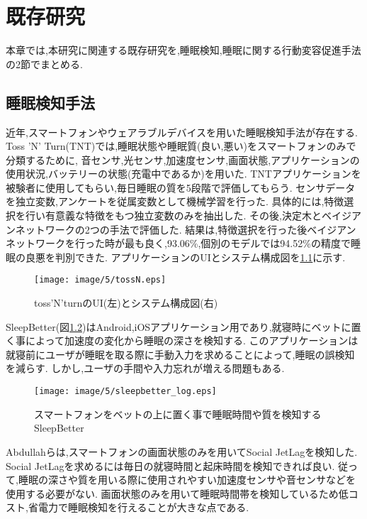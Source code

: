 \chapter{既存研究}
本章では,本研究に関連する既存研究を,睡眠検知,睡眠に関する行動変容促進手法の2節でまとめる.

\section{睡眠検知手法}
%
%
%
近年,スマートフォンやウェアラブルデバイスを用いた睡眠検知手法が存在する.
Toss 'N' Turn(TNT)\cite{TossN}では,睡眠状態や睡眠質(良い,悪い)をスマートフォンのみで分類するために,
音センサ,光センサ,加速度センサ,画面状態,アプリケーションの使用状況,バッテリーの状態(充電中であるか)を用いた.
TNTアプリケーションを被験者に使用してもらい,毎日睡眠の質を5段階で評価してもらう.
センサデータを独立変数,アンケートを従属変数として機械学習を行った.
具体的には,特徴選択を行い有意義な特徴をもつ独立変数のみを抽出した.
その後,決定木とベイジアンネットワークの2つの手法で評価した.
結果は,特徴選択を行った後ベイジアンネットワークを行った時が最も良く,93.06\%,個別のモデルでは94.52\%の精度で睡眠の良悪を判別できた.
アプリケーションのUIとシステム構成図を\ref{tossn}に示す.

\begin{figure}[tbp]
	\begin{center}
		\texttt{[image: image/5/tossN.eps]}
		\caption{toss'N'turnのUI(左)とシステム構成図(右)}
		\label{tossn}
	\end{center}
\end{figure}

SleepBetter\cite{SleepBetter}(図\ref{sleepbetter})はAndroid,iOSアプリケーション用であり,就寝時にベットに置く事によって加速度の変化から睡眠の深さを検知する.
このアプリケーションは就寝前にユーザが睡眠を取る際に手動入力を求めることによって,睡眠の誤検知を減らす.
しかし,ユーザの手間や入力忘れが増える問題もある.

\begin{figure}[tbp]
	\begin{center}
		\texttt{[image: image/5/sleepbetter\_log.eps]}
		\caption{スマートフォンをベットの上に置く事で睡眠時間や質を検知するSleepBetter}
		\label{sleepbetter}
	\end{center}
\end{figure}

Abdullahら\cite{abdullah2014towards}は,スマートフォンの画面状態のみを用いてSocial JetLagを検知した.
Social JetLagを求めるには毎日の就寝時間と起床時間を検知できれば良い.
従って,睡眠の深さや質を用いる際に使用されやすい加速度センサや音センサなどを使用する必要がない.
画面状態のみを用いて睡眠時間帯を検知しているため低コスト,省電力で睡眠検知を行えることが大きな点である.


